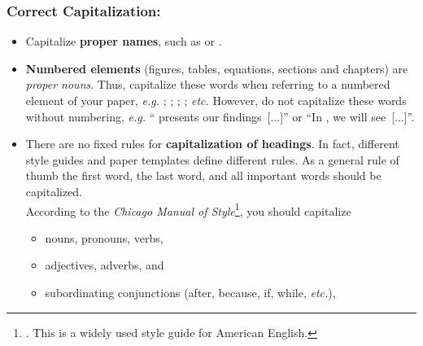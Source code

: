 \documentclass[11pt,a4paper]{article}
\begin{document}
\subsubsection*{Correct Capitalization:}
\begin{itemize} 
  \item Capitalize \textbf{proper names}, such as  or .

  \item \textbf{Numbered elements} (figures, tables, equations, sections and chapters) are \emph{proper nouns}.
  Thus, capitalize these words when referring to a numbered element of your paper, \emph{e.g.} ; ; ; ; \emph{etc.}
  However, do not capitalize these words without numbering, \emph{e.g.} `` presents our findings~[...]'' or ``In , we will see~[...]''.
  
  \item There are no fixed rules for \textbf{capitalization of headings}. In fact, different style guides and paper templates define different rules.
  As a general rule of thumb the first word, the last word, and all important words should be capitalized.\\According to the \emph{Chicago Manual of Style}\footnote{. This is a widely used style guide for American English.}, you should capitalize
  
\vspace{-0.25cm}
\begin{itemize}
\item nouns, pronouns, verbs,
\item adjectives, adverbs, and
\item subordinating conjunctions (after, because, if, while, \emph{etc.}),
\end{itemize}


\end{itemize}
\end{document}
